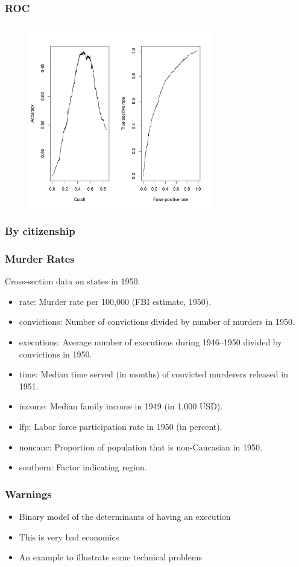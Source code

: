 \documentclass{beamer}
\newcommand{\1}{\mathbb{1}}
\begin{document}
\begin{frame}\frametitle{ROC}
\begin{figure}
\includegraphics[width = 8cm]{Plot/roc}
\end{figure}
\end{frame}

\begin{frame}\frametitle{By citizenship}

\end{frame}

\begin{frame}\frametitle{Murder Rates}
Cross-section data on states in 1950.
\begin{itemize}
 \item rate: Murder rate per 100,000 (FBI estimate, 1950).
 \item convictions: Number of convictions divided by number of murders in 1950.
 \item executions: Average number of executions during 1946--1950 divided by convictions in 1950.
\item time: Median time served (in months) of convicted murderers released in 1951.
\item income: Median family income in 1949 (in 1,000 USD).
\item lfp: Labor force participation rate in 1950 (in percent).
\item noncauc: Proportion of population that is non-Caucasian in 1950.
\item southern: Factor indicating region.
\end{itemize}
\end{frame}

\begin{frame}\frametitle{Warnings}
\begin{itemize}
\item Binary model of the determinants of having an execution
\item This is very bad economics
\item An example to illustrate some technical problems
\end{itemize}
\end{frame}
\end{document}
